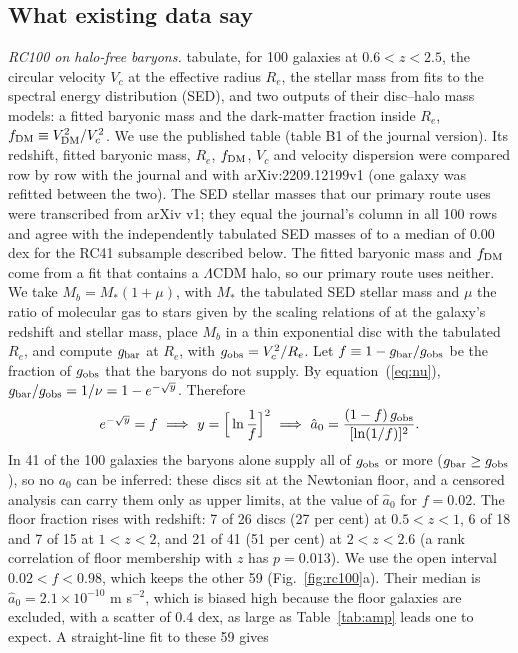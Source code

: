 \documentclass[fleqn,usenatbib]{mnras}
\begin{document}
\subsection{What existing data say}
\label{sec:existing}
\emph{RC100 on halo-free baryons.} \citet{NestorShachar2023} tabulate, for 100 galaxies at $0.6<z<2.5$, the circular velocity $V_c$ at the effective radius $R_e$, the stellar mass from fits to the spectral energy distribution (SED), and two outputs of their disc--halo mass models: a fitted baryonic mass and the dark-matter fraction inside $R_e$, $f_{\rm DM}\equiv V_{\rm DM}^2/V_c^2$. We use the published table (table B1 of the journal version). Its redshift, fitted baryonic mass, $R_e$, $f_{\rm DM}$, $V_c$ and velocity dispersion were compared row by row with the journal and with arXiv:2209.12199v1 (one galaxy was refitted between the two). The SED stellar masses that our primary route uses were transcribed from arXiv v1; they equal the journal's column in all 100 rows and agree with the independently tabulated SED masses of \citet{Price2021} to a median of 0.00 dex for the RC41 subsample described below. The fitted baryonic mass and $f_{\rm DM}$ come from a fit that contains a $\Lambda$CDM halo, so our primary route uses neither. We take $M_b=M_*(1+\mu)$, with $M_*$ the tabulated SED stellar mass and $\mu$ the ratio of molecular gas to stars given by the scaling relations of \citet{Tacconi2018} at the galaxy's redshift and stellar mass, place $M_b$ in a thin exponential disc with the tabulated $R_e$, and compute $g_{\rm bar}$ at $R_e$, with $g_{\rm obs}=V_c^2/R_e$. Let $f\equiv1-g_{\rm bar}/g_{\rm obs}$ be the fraction of $g_{\rm obs}$ that the baryons do not supply. By equation~(\ref{eq:nu}), $g_{\rm bar}/g_{\rm obs}=1/\nu=1-e^{-\sqrt y}$. Therefore
\begin{equation}
e^{-\sqrt y}=f\ \Longrightarrow\ y=\Big[\ln\frac1{f}\Big]^2\ \Longrightarrow\ \hat a_0=\frac{(1-f)\,g_{\rm obs}}{[\ln(1/f)]^2} .
\label{eq:rc100}
\end{equation}
In 41 of the 100 galaxies the baryons alone supply all of $g_{\rm obs}$ or more ($g_{\rm bar}\geq g_{\rm obs}$), so no $a_0$ can be inferred: these discs sit at the Newtonian floor, and a censored analysis can carry them only as upper limits, at the value of $\hat a_0$ for $f=0.02$. The floor fraction rises with redshift: 7 of 26 discs (27 per cent) at $0.5<z<1$, 6 of 18 and 7 of 15 at $1<z<2$, and 21 of 41 (51 per cent) at $2<z<2.6$ (a rank correlation of floor membership with $z$ has $p=0.013$). We use the open interval $0.02<f<0.98$, which keeps the other 59 (Fig.~\ref{fig:rc100}a). Their median is $\hat a_0=2.1\times10^{-10}$ m s$^{-2}$, which is biased high because the floor galaxies are excluded, with a scatter of 0.4 dex, as large as Table~\ref{tab:amp} leads one to expect. A straight-line fit to these 59 gives
\end{document}
